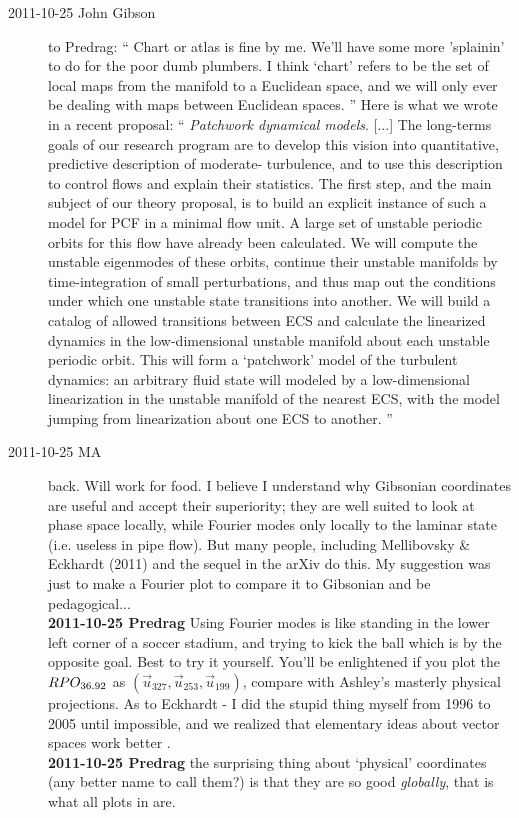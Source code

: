 \begin{description}
\item[2011-10-25 John Gibson~~]  to Predrag: ``         \toCB
Chart or atlas is fine by me. We'll have some more 'splainin' to do for
the poor dumb plumbers. I think `chart' refers to be the set of
local maps from the manifold to a Euclidean space, and we will only ever
be dealing with maps between Euclidean spaces.
'' Here is what we wrote in a recent proposal: ``
{\em Patchwork dynamical models}. [...]
The long-terms goals of our research program are to develop this vision into
quantitative, predictive description of moderate-{\Reynolds} turbulence, and
to use this description to control flows and explain their statistics. The
first step, and the main subject of our theory proposal, is to build an explicit
instance of such a model for PCF in a minimal flow unit. A large set of
unstable periodic orbits for this flow have already been calculated.
We will compute the unstable eigenmodes of these orbits, continue their
unstable manifolds by time-integration of small perturbations, and thus map
out the conditions under which one unstable state transitions into another.
We will build a catalog of allowed transitions between ECS and calculate
the linearized dynamics in the low-dimensional unstable manifold about each
unstable periodic orbit. This will form a `patchwork' model of the turbulent
dynamics: an arbitrary fluid state will modeled by a low-dimensional
linearization in the unstable manifold of the nearest ECS, with the model
jumping from linearization about one ECS to another.
''


\item[2011-10-25 MA~~] back. Will work for food. I believe I understand
why Gibsonian coordinates are useful and accept their superiority; they
are well suited to look at phase space locally, while Fourier modes only
locally to the laminar state (i.e. useless in pipe flow). But many
people, including Mellibovsky \& Eckhardt (2011) and the sequel in the
arXiv do this. My suggestion was just to make a Fourier plot to compare
it to Gibsonian and be pedagogical...
\\
{\bf 2011-10-25 Predrag} Using Fourier modes is like standing in the
lower left corner of a soccer stadium, and trying to kick the ball which
is by the opposite goal. Best to try it yourself. You'll be enlightened
if you plot the $RPO_{36.92}$ as
$(\vec{u}_{327},\vec{u}_{253},\vec{u}_{199})$, compare with Ashley's
masterly physical projections. As to Eckhardt - I did the stupid thing
myself from 1996 to 2005  until impossible, and we
realized that elementary ideas about vector spaces work better
.
\\
{\bf 2011-10-25 Predrag} the surprising thing about `physical' coordinates
(any better name to call them?)
is that they are so good \emph{globally}, that is what all plots in
 are.



\end{description}
